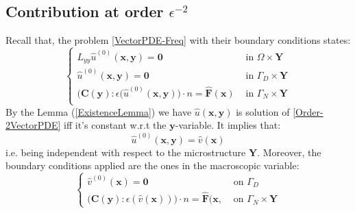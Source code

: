 \subsection{Contribution at order $\epsilon^{-2}$}
Recall that, the problem \ref{VectorPDE-Freq} with their boundary conditions states:
\begin{equation}
    \label{Order-2VectorPDE}
    \left \{
    \begin{array}{cc}
        L_{yy} \hat{u}^{(0)}( \mathbf{x},\mathbf{y}) = \mathbf{0} & \text{ in } \Omega \times \mathbf{Y}\\
        \hat{u}^{(0)} (\mathbf{x},\mathbf{y}) = \mathbf{0} & \text{ in } \Gamma_D \times \mathbf{Y} \\
        \big( \mathbf{C}(\mathbf{y}) :\epsilon(\hat{u}^{(0)}(\mathbf{x},\mathbf{y}) \big) \cdot n = \hat{\mathbf{F}}(\mathbf{x}) & \text{ in } \Gamma_N \times \mathbf{Y} \\
    \end{array}
    \right .
\end{equation}
By the Lemma (\ref{ExistenceLemma}) we have $\hat{u}(\mathbf{x},\mathbf{y})$ is solution of \ref{Order-2VectorPDE} iff it's constant w.r.t the $\mathbf{y}$-variable. It implies that:
\begin{equation}
    \label{IndepencyofY}
    \hat{u}^{(0)}(\mathbf{x},\mathbf{y}) = \hat{v}(\mathbf{x})
\end{equation}
i.e. being independent with respect to the microstructure $\mathbf{Y}$. Moreover, the boundary conditions applied are the ones in the macroscopic variable:
\begin{equation*}
    \left \{
    \begin{array}{cc}
        \hat{v}^{(0)}(\mathbf{x}) = \mathbf{0} & \text{ on } \Gamma_D\\
        \big(\mathbf{C}(\mathbf{y}):\epsilon(\hat{v}(\mathbf{x})) \big) \cdot n = \hat{\mathbf{F}}(\mathbf{x}, & \text{ on } \Gamma_N \times \mathbf{Y}
    \end{array}
    \right .
\end{equation*}

